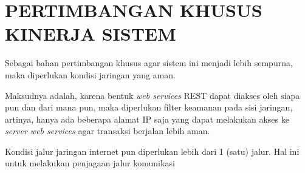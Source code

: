 \chapter{PERTIMBANGAN KHUSUS KINERJA SISTEM}

Sebagai bahan pertimbangan khusus agar sistem ini menjadi lebih sempurna, maka diperlukan kondisi jaringan yang aman. 

Maksudnya adalah, karena bentuk \textit{web services} REST dapat diakses oleh siapa pun dan dari mana pun, maka diperlukan filter keamanan pada sisi jaringan, artinya, hanya ada beberapa alamat IP saja yang dapat melakukan akses ke \textit{server web services} agar transaksi berjalan lebih aman.

Kondisi jalur jaringan internet pun diperlukan lebih dari 1 (satu) jalur. Hal ini untuk melakukan penjagaan jalur komunikasi